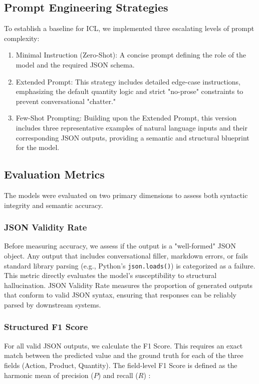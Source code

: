 \documentclass[journal,article,submit,pdftex,moreauthors]{Definitions/mdpi}
\begin{document}
\subsection{Prompt Engineering Strategies}
To establish a baseline for ICL, we implemented three escalating levels of prompt complexity:

\begin{enumerate}
    \item Minimal Instruction (Zero-Shot): A concise prompt defining the role of the model and the required JSON schema.
    \item Extended Prompt: This strategy includes detailed edge-case instructions, emphasizing the default quantity logic and strict "no-prose" constraints to prevent conversational "chatter."
    \item Few-Shot Prompting: Building upon the Extended Prompt, this version includes three representative examples of natural language inputs and their corresponding JSON outputs, providing a semantic and structural blueprint for the model.
\end{enumerate}

\subsection{Evaluation Metrics}

The models were evaluated on two primary dimensions to assess both syntactic integrity and semantic accuracy.

\subsubsection{JSON Validity Rate}
Before measuring accuracy, we assess if the output is a "well-formed" JSON object. Any output that includes conversational filler, markdown errors, or fails standard library parsing (e.g., Python's \texttt{json.loads()}) is categorized as a failure. This metric directly evaluates the model's susceptibility to structural hallucination. JSON Validity Rate measures the proportion of generated outputs that conform to valid JSON syntax, ensuring that responses can be reliably parsed by downstream systems.

\subsubsection{Structured F1 Score}
For all valid JSON outputs, we calculate the F1 Score. This requires an exact match between the predicted value and the ground truth for each of the three fields (Action, Product, Quantity). The field-level F1 Score is defined as the harmonic mean of precision ($P$) and recall ($R$) \cite{wang2024adaptable}:
\end{document}

